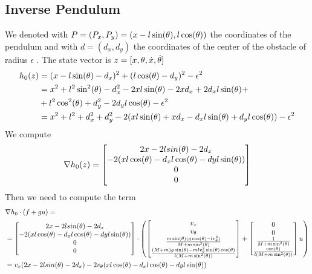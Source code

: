 \subsection{Inverse Pendulum}
We denoted  with $ P = (P_x , P_y) = (x - l \sin(\theta) , l \cos(\theta) )  $ the coordinates of the pendulum  and with $d = (d_x , d_y)$ the coordinates of the center of the obstacle of radius $\epsilon$ . The state vector is $z = [ x , \theta , \dot{x} , \dot{\theta}] $
\begin{align*}
	h_0(z) &= (x-l \sin(\theta)-d_x) ^2 + (l \cos(\theta) - d_y)^2 - \epsilon^2 \\ 
	&= x^2 + l^2 \sin^2(\theta) -d_x^2 - 2xl\sin(\theta) - 2 x d_x + 2 d_x l\sin(\theta) + \\
	&+ l^2 \cos^2(\theta) + d_y^2 - 2 d_y l \cos(\theta) - \epsilon^2 \\
	& = x^2 + l^2 + d_x^2 + d_y ^2  - 2 ( xl\sin(\theta) + x d_x - d_x l\sin(\theta) +   d_y l \cos(\theta) ) - \epsilon^2
\end{align*}
We compute 
\begin{align*}
	\nabla h _0(z) = 
	\begin{bmatrix}
		2x - 2l sin(\theta) -2 d_x \\
		-2(x l \cos(\theta) - d_x l \cos(\theta) - dy l \sin(\theta) ) \\	
		0 \\ 
		0 
	\end{bmatrix}
\end{align*}
Then we need to compute the term 
\begin{align*}
	&\nabla h_0 \cdot(f+gu)  =  \\ 
	&= \begin{bmatrix}
		2x - 2l sin(\theta) -2 d_x \\
		-2(x l \cos(\theta) - d_x l \cos(\theta) - dy l \sin(\theta) ) \\	
		0 \\ 
		0 
	\end{bmatrix} \cdot \left( \begin{bmatrix} 
	v_x \\ 
	v_\theta \\ 
	\frac{m \sin(\theta) (g \cos(\theta) - l v_\theta^2)}{M + m \sin^2(\theta)} \\ 
	\frac{(M+m)g \sin(\theta) - m l v_\theta^2 \sin(\theta)\cos(\theta)}{l(M + m \sin^2(\theta))} 
	\end{bmatrix} + \begin{bmatrix} 
	0 \\ 
	0 \\ 
	\frac{1}{M + m \sin^2(\theta)} \\ 
	\frac{\cos(\theta)}{l(M + m \sin^2(\theta))} 
	\end{bmatrix}u\right)\\
	&= v_x(2x - 2l sin(\theta) -2 d_x) - 2 v_{\theta} (x l \cos(\theta) - d_x l \cos(\theta) - dy l \sin(\theta))
\end{align*}

